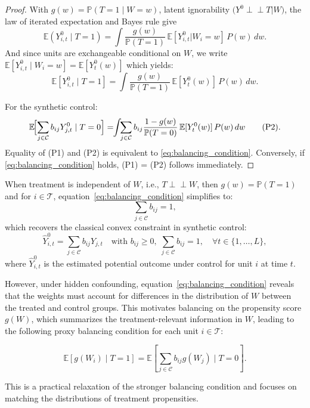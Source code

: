 \documentclass[10pt]{article} %
\begin{document}
\begin{proof}
    
 
With $g(w)=\mathbb{P}(T=1\mid W=w)$, {latent ignorability} $\bigl(Y^0\perp\!\!\!\perp T\bigr|W\bigr)$, the law of iterated expectation {and Bayes rule }give
\[
\mathbb{E}(Y_{i,t}^0\mid T=1)=
\!\!\int\!\!\frac{g(w)}{\mathbb{P}(T=1)}\,\mathbb{E}[Y_{i,t}^0|W_i=w]\,P(w)\,dw. \tag{P1}
\]
{And since units are exchangeable conditional on  $W$, we write $\mathbb{E}[Y^0_{i,t} \mid W_i=w] = \mathbb{E}[Y^0_t(w)]$ which yields: \[
\mathbb{E}[Y_{i,t}^0\mid T=1]=
\!\!\int\!\!\frac{g(w)}{\mathbb{P}(T=1)}\,\mathbb{E}[Y^0_t(w)]\,  P(w)\,dw. 
\]} 

For the synthetic control:
\[
\mathbb{E}\!\Bigl[\sum_{j  \in \mathcal{C}}b_{ij}Y_{j,t}^0\mid T=0\Bigr]=
\!\!\int\!\!\sum_{j \in \mathcal{C}}b_{ij}\frac{1-g(w)}{\mathbb{P}(T=0)}\,
\mathbb{E}[Y^0_t(w)]\, P(w)\,dw \tag{P2}.
\]
Equality of (P1) and (P2) is equivalent to \eqref{eq:balancing_condition}.  
Conversely, if \eqref{eq:balancing_condition} holds, (P1) = (P2) follows immediately. 
\end{proof}



When treatment is independent of \(W\), i.e., \(T \perp\!\!\!\perp  W\), then \(g(w) = \mathbb{P}(T=1)\) and { for $i \in \mathcal{T}$, }equation~\ref{eq:balancing_condition} simplifies to:
\[
\sum_{j \in \mathcal{C}} b_{ij} = 1,
\]
which recovers the classical convex constraint in synthetic control{}:
\[
\hat{Y}^0_{i,t} = \sum_{j \in \mathcal{C}} b_{ij} Y_{j,t} \quad \text{with } b_{ij} \geq 0, \; \sum_{j \in \mathcal{C}} b_{ij} = 1, \quad \forall t \in \{1, \dots, L\},
\]
{where $\hat{Y}^0_{i,t}$ is the estimated potential outcome under control for unit $i$ at time $t$}.


However, under hidden confounding, equation~\ref{eq:balancing_condition} reveals that the weights must account for differences in the distribution of \( W \) between the treated and control groups. {This motivates balancing on the propensity score $g(W)$, which summarizes the treatment-relevant information in $W$\citep{rosenbaum1983central}, leading to the following proxy balancing condition for each unit \(i \in \mathcal{T}\):}

\begin{equation}
\mathbb{E}[g(W_i) \mid T=1] = \mathbb{E}\left[ \sum_{j \in \mathcal{C}} b_{ij} g(W_j) \mid T=0 \right].
\label{eq:proxy_balancing}
\end{equation}

This is a practical relaxation of the stronger balancing condition and focuses on matching the distributions of treatment propensities.
\end{document}
